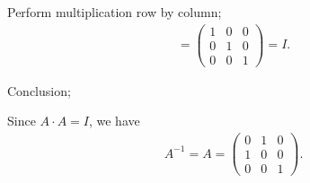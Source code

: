 \documentclass{beamer}
\theoremstyle{remark}
\numberwithin{equation}{section}
\begin{document}
Perform multiplication row by column;
\begin{align}
=
\begin{pmatrix}
1 & 0 & 0 \\
0 & 1 & 0 \\
0 & 0 & 1
\end{pmatrix}
= I.
\end{align}

Conclusion;

Since $A \cdot A = I$, we have
\begin{align}
A^{-1} = A =
\begin{pmatrix}
0 & 1 & 0 \\
1 & 0 & 0 \\
0 & 0 & 1
\end{pmatrix}.
\end{align}
\end{document}
